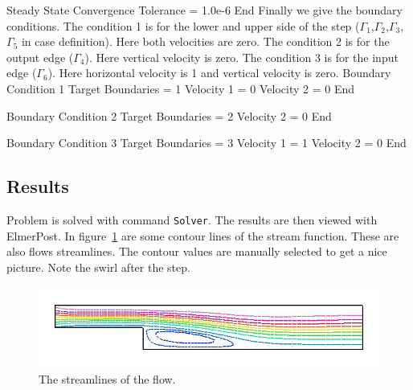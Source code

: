   Steady State Convergence Tolerance = 1.0e-6
End  
\ttend
Finally we give the boundary conditions.
The condition 1 is for the lower and upper side of the step 
($\Gamma_1$,$\Gamma_2$,$\Gamma_3$,$\Gamma_5$ in case definition).
Here both velocities are zero.
The condition 2 is for the output edge ($\Gamma_4$). Here vertical velocity is zero. 
The condition 3 is for the input edge ($\Gamma_6$). Here horizontal velocity is 1 and 
vertical velocity is zero.
\ttbegin
Boundary Condition 1
  Target Boundaries = 1
  Velocity 1 = 0
  Velocity 2 = 0
End

Boundary Condition 2
  Target Boundaries = 2
  Velocity 2 = 0
End

Boundary Condition 3
  Target Boundaries = 3
  Velocity 1 = 1
  Velocity 2 = 0
End
\ttend
\subsection*{Results}
Problem is solved with command {\tt Solver}. The results are then viewed with
ElmerPost. In figure~\ref{f:streamlines} are some contour lines of the stream
function. These are also flows streamlines. The contour values are manually
selected to get a nice picture. Note the swirl after the step.
\begin{figure}[!hb]
\begin{center}
\includegraphics[width=1.0\textwidth]{lines}
\end{center}
\caption{The streamlines of the flow.}
\label{f:streamlines}
\end{figure}







